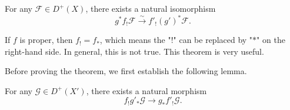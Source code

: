 \begin{theorem}
For any $\mathcal{F} \in D^+(X)$, there exists a natural isomorphism
\begin{equation*}
    g^* f_! \mathcal{F} \xrightarrow{\sim} f'_! (g')^* \mathcal{F}.
\end{equation*}
\end{theorem}

\begin{remark}
If $f$ is proper, then $f_! = f_*$, which means the "$!$" can be replaced by "$*$" on the right-hand side. In general, this is not true. This theorem is very useful.
\end{remark}

Before proving the theorem, we first establish the following lemma.

\begin{lemma}
For any $\mathcal{G} \in D^+(X')$, there exists a natural morphism
\begin{equation*}
    f_! g'_* \mathcal{G} \longrightarrow g_* f'_! \mathcal{G}.
\end{equation*}
\end{lemma}

